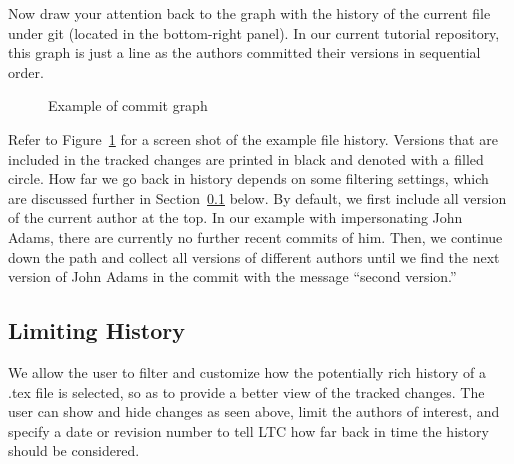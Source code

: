 Now draw your attention back to the graph with the history of the current file under git (located in the bottom-right panel).  In our current tutorial repository, this graph is just a line as the authors committed their versions in sequential order.  %
\begin{figure}[t]
\centering
{}
\caption{Example of commit graph} \label{fig:commit-graph}
\end{figure}
Refer to Figure~\ref{fig:commit-graph} for a screen shot of the example file history. Versions that are included in the tracked changes are printed in black and denoted with a filled circle.  How far we go back in history depends on some filtering settings, which are discussed further in Section~\ref{sec:limit-history} below.  By default, we first include all version of the current author at the top.  In our example with impersonating John Adams, there are currently no further recent commits of him.  Then, we continue down the path and collect all versions of different authors until we find the next version of John Adams in the commit with the message ``second version.''


\subsection{Limiting History} \label{sec:limit-history}

We allow the user to filter and customize how the potentially rich history of a .tex file is selected, so as to provide a better view of the tracked changes.  The user can show and hide changes as seen above, limit the authors of interest, and specify a date or revision number to tell LTC how far back in time the history should be considered.


